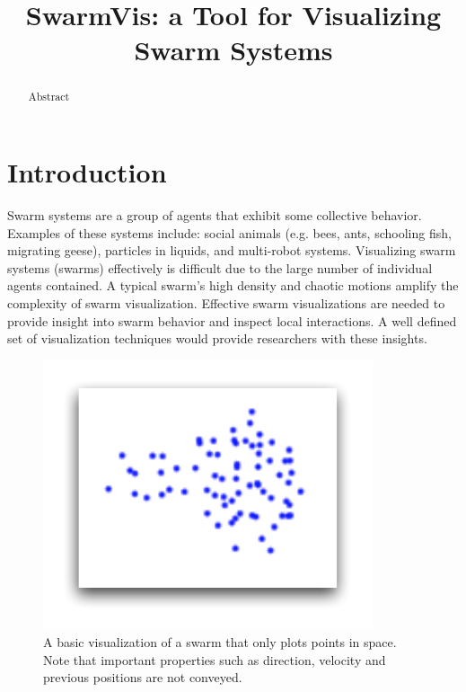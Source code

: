 \documentclass[conference]{IEEEtran}
\begin{document}
\title{SwarmVis: a Tool for Visualizing Swarm Systems}

\author{
\and
{}
}
\maketitle


\begin{abstract}
Abstract 
\end{abstract}

\section{Introduction}
Swarm systems are a group of agents that exhibit some collective behavior. Examples of these systems include: social animals (e.g. bees, ants, schooling fish, migrating geese), particles in liquids,  and multi-robot systems. Visualizing swarm systems (swarms) effectively is difficult due to the large number of individual agents contained. A typical swarm's high density and chaotic motions amplify the complexity of swarm visualization. Effective swarm visualizations are needed to provide insight into swarm behavior and inspect local interactions.
A well defined set of visualization techniques would provide researchers with these insights.

\begin{figure}[ht]
\centering
\includegraphics[scale=1]{images/basic.pdf}
\caption{A basic visualization of a swarm that only plots points in space. Note that important properties such as direction, velocity
and previous positions are not conveyed.}
\label{old}
\end{figure}
\end{document}
